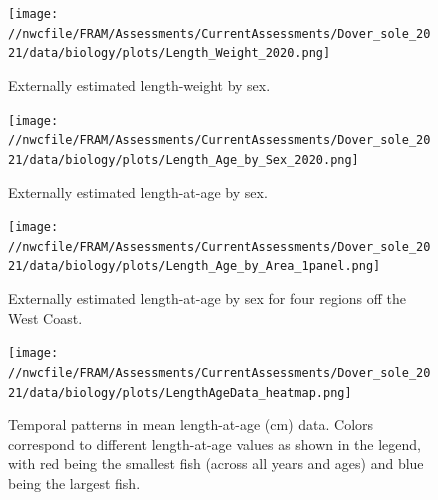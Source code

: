 \documentclass[11pt,
  english,
  a4paper,
]{article}
\begin{document}
\begin{figure}
\centering
\texttt{[image: //nwcfile/FRAM/Assessments/CurrentAssessments/Dover\_sole\_2021/data/biology/plots/Length\_Weight\_2020.png]}
\caption{Externally estimated length-weight by sex.\label{fig:est-len-wght}}
\end{figure}

\tagmcend\tagstructend


\begin{figure}
\centering
\texttt{[image: //nwcfile/FRAM/Assessments/CurrentAssessments/Dover\_sole\_2021/data/biology/plots/Length\_Age\_by\_Sex\_2020.png]}
\caption{Externally estimated length-at-age by sex.\label{fig:est-len-at-age}}
\end{figure}

\tagmcend\tagstructend


\begin{figure}
\centering
\texttt{[image: //nwcfile/FRAM/Assessments/CurrentAssessments/Dover\_sole\_2021/data/biology/plots/Length\_Age\_by\_Area\_1panel.png]}
\caption{Externally estimated length-at-age by sex for four regions off the West Coast.\label{fig:est-len-at-age-region}}
\end{figure}

\tagmcend\tagstructend


\begin{figure}
\centering
\texttt{[image: //nwcfile/FRAM/Assessments/CurrentAssessments/Dover\_sole\_2021/data/biology/plots/LengthAgeData\_heatmap.png]}
\caption{Temporal patterns in mean length-at-age (cm) data. Colors correspond to different length-at-age values as shown in the legend, with red being the smallest fish (across all years and ages) and blue being the largest fish.\label{fig:tv-len-at-age}}
\end{figure}

\tagmcend\tagstructend
\end{document}
